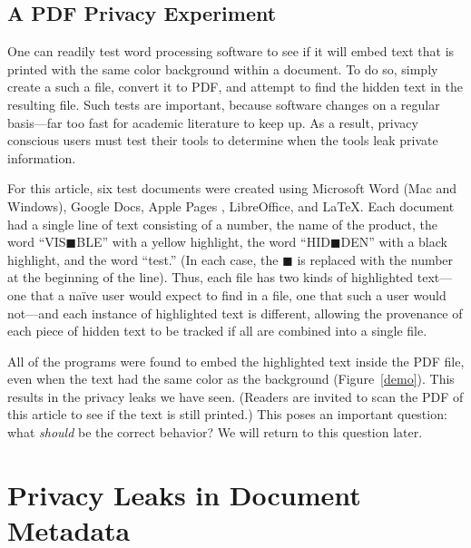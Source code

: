 \documentclass{article}
\begin{document}


\subsection{A PDF Privacy Experiment}
One can readily test word processing software to see if it will embed
text that is printed with the same color background within a
document. To do so, simply create a such a file, convert it to
PDF, and attempt to find the hidden text in the resulting file. Such
tests are important, because software changes on a regular basis---far
too fast for academic literature to keep up. As a result, privacy
conscious users must test their tools to
determine when the tools leak private
information.

For this article, six test documents were created using Microsoft Word
(Mac and Windows), Google Docs, Apple Pages , LibreOffice, and \LaTeX.
Each document had a single line of text consisting of a number, the
name of the product, the word ``VIS$\blacksquare$BLE'' with a yellow
highlight, the word ``HID$\blacksquare$DEN'' with a black
highlight, and the word ``test.'' (In each case, the
$\blacksquare$ is replaced with the number at the beginning of the line). Thus, each
file has two kinds of highlighted text---one that a na\"ive user would expect to find in
a file, one that such a user would not---and each instance of highlighted
text is different, allowing the provenance of each piece of hidden
text to be tracked if  all are combined into a single file. 

All of the programs were found to embed the highlighted text inside the
PDF file, even when the text had the same color as the
background (Figure~\ref{demo}). This results in the privacy leaks we
have seen. (Readers are invited to scan the PDF of this article to see
if the text is still printed.) This poses an important
question: what \emph{should} be the correct behavior?  We will return
to this question later.

\section{Privacy Leaks in Document Metadata}
\end{document}
